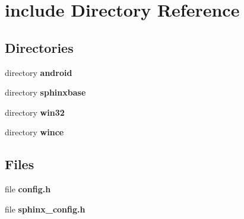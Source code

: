\section{include Directory Reference}
\label{dir_d44c64559bbebec7f509842c48db8b23}
\subsection*{Directories}
\begin{DoxyCompactItemize}
\item 
directory {\bf android}
\item 
directory {\bf sphinxbase}
\item 
directory {\bf win32}
\item 
directory {\bf wince}
\end{DoxyCompactItemize}
\subsection*{Files}
\begin{DoxyCompactItemize}
\item 
file {\bfseries config.\-h}
\item 
file {\bfseries sphinx\-\_\-config.\-h}
\end{DoxyCompactItemize}
